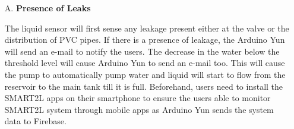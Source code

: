 \documentclass[12pt,times,a4paper]{report}
\begin{document}
{{\begin{normalsize}
\begin{figure}
\begin{center}
\caption{}
\end{center}
\end{figure}
\pagebreak
\begin{itemize}
    \item[A.]\textbf{Presence of Leaks}
    \par
    The liquid sensor will first sense any leakage present either at the valve or the distribution of PVC pipes. If there is a presence of leakage, the Arduino Yun will send an e-mail to notify the users. The decrease in the water below the threshold level will cause Arduino Yun to send an e-mail too. This will cause the pump to automatically pump water and liquid will start to flow from the reservoir to the main tank till it is full. Beforehand, users need to install the SMART2L apps on their smartphone to ensure the users able to monitor SMART2L system through mobile apps as Arduino Yun sends the system data to Firebase.
\begin{figure}
\begin{center}
\caption{}
\end{center}

\end{figure}
\end{itemize}
\end{normalsize}}}
\end{document}
